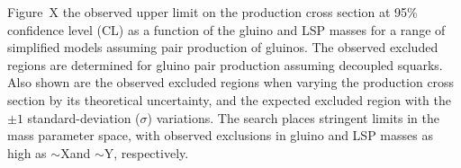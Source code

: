 
Figure~X  
the observed upper limit on the
production cross section at 95\% confidence level (CL) as a function
of the gluino and LSP masses for a range of simplified models assuming
pair production of gluinos. The observed excluded regions are
determined for gluino pair production assuming decoupled squarks. Also
shown are the observed excluded regions when varying the production
cross section by its theoretical uncertainty, and the expected
excluded region with the ${\pm}1$ standard-deviation ($\sigma$)
variations. The search places stringent limits in the mass parameter
space, with observed exclusions in gluino and LSP masses as high as
$\sim$X\gev and $\sim$Y\gev, respectively.

